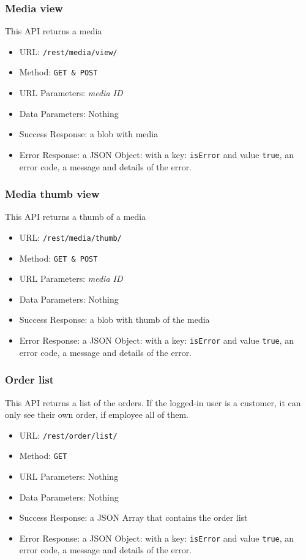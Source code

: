 \subsubsection*{Media view}

This API returns a media

\begin{itemize}
    \item URL: \texttt{/rest/media/view/}
    \item Method: \texttt{GET \& POST}
    \item URL Parameters: \textit{media ID}
    \item Data Parameters: Nothing
    \item Success Response: a blob with media
    \item Error Response: a JSON Object: with a key: \texttt{isError}  and value \texttt{true}, an error code, a message and details of the error.
\end{itemize}

\subsubsection*{Media thumb view}

This API returns a thumb of a media

\begin{itemize}
    \item URL: \texttt{/rest/media/thumb/}
    \item Method: \texttt{GET \& POST}
    \item URL Parameters: \textit{media ID}
    \item Data Parameters: Nothing
    \item Success Response: a blob with thumb of the media
    \item Error Response: a JSON Object: with a key: \texttt{isError}  and value \texttt{true}, an error code, a message and details of the error.
\end{itemize}


\subsubsection*{Order list}

This API returns a list of the orders.
If the logged-in user is a customer, it can only see their own order, if employee all of them.

\begin{itemize}
    \item URL: \texttt{/rest/order/list/}
    \item Method: \texttt{GET}
    \item URL Parameters: Nothing
    \item Data Parameters: Nothing
    \item Success Response: a JSON Array that contains the order list
    \item Error Response: a JSON Object: with a key: \texttt{isError}  and value \texttt{true}, an error code, a message and details of the error.
\end{itemize}

